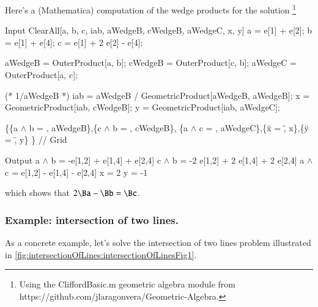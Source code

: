 Here's a (Mathematica) computation of the wedge products for the solution
\footnote{
Using the
CliffordBasic.m
geometric algebra module from
https://github.com/jlaragonvera/Geometric-Algebra.
}

\begin{mmaCell}[moredefined={a, b, c, iab, aWedgeB, cWedgeB, aWedgeC, x, y, e, OuterProduct, GeometricProduct}]{Input}
  ClearAll[a, b, c, iab, aWedgeB, cWedgeB, aWedgeC, x, y]
  a = e[1] + e[2];
  b = e[1] + e[4];
  c = e[1] + 2 e[2] - e[4]; 
  
  aWedgeB = OuterProduct[a, b];
  cWedgeB = OuterProduct[c, b];
  aWedgeC = OuterProduct[a, c];
  
  (* 1/aWedgeB *)
  iab = aWedgeB / GeometricProduct[aWedgeB, aWedgeB]; 
  x = GeometricProduct[iab, cWedgeB];
  y = GeometricProduct[iab, aWedgeC];
  
  \{\{a \(\pmb{\wedge}\) b = , aWedgeB\},\{c \(\pmb{\wedge}\) b = , cWedgeB\}, 
  \{a \(\pmb{\wedge}\) c = , aWedgeC\},\{\"x = \", x\},\{\"y = \", y\}
  \} // Grid
\end{mmaCell}
\begin{mmaCell}{Output}
  a \(\wedge\) b = 	-e[1,2] + e[1,4] + e[2,4]
  c \(\wedge\) b = 	-2 e[1,2] + 2 e[1,4] + 2 e[2,4]
  a \(\wedge\) c = 	e[1,2] - e[1,4] - e[2,4]
  x = 	2
  y = 	-1
\end{mmaCell}

which shows that \( 2 \Ba - \Bb = \Bc \).
\subsubsection{Example: intersection of two lines.}

As a concrete example, let's solve the intersection of two lines problem illustrated in \cref{fig:intersectionOfLines:intersectionOfLinesFig1}.

